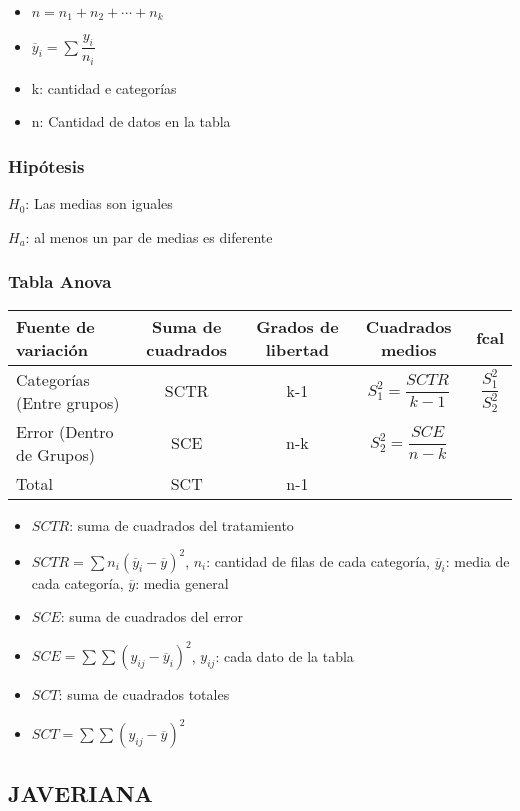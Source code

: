 \begin{itemize}
	\item $n=n_1+n_2+\cdots+n_k$
	\item $\overline{y}_i=\sum\dfrac{y_i}{n_i}$
	\item k: cantidad e categorías
	\item n: Cantidad de datos en la tabla
\end{itemize}

\subsubsection{Hipótesis}
$H_0$: Las medias son iguales

$H_a$: al menos un par de medias es diferente

\subsubsection{Tabla Anova}
\begin{tabular}{lcccc}
	\hline
	Fuente de variación & Suma de cuadrados & Grados de libertad & Cuadrados medios & fcal\\
	\hline
	Categorías (Entre grupos) & SCTR & k-1 & $S_1^2=\dfrac{SCTR}{k-1}$ & $\dfrac{S_1^2}{S_2^2}$\\
	Error (Dentro de Grupos) & SCE & n-k & $S_2^2=\dfrac{SCE}{n-k}$ & \\
	\hline
	\hline
	Total & SCT & n-1
\end{tabular}

\begin{itemize}
	\item $SCTR$: suma de cuadrados del tratamiento
	\item $SCTR=\sum n_i(\overline{y}_i-\overline{y})^2$, $n_i$: cantidad de filas de cada categoría, $\overline{y}_i$: media de cada categoría, $\overline{y}$: media general
	\item $SCE$: suma de cuadrados del error
	\item $SCE=\sum\sum(y_{ij}-\overline{y}_i)^2$, $y_{ij}$: cada dato de la tabla
	\item $SCT$: suma de cuadrados totales
	\item $SCT=\sum\sum(y_{ij}-\overline{y})^2$
\end{itemize}

\subsection{JAVERIANA}

